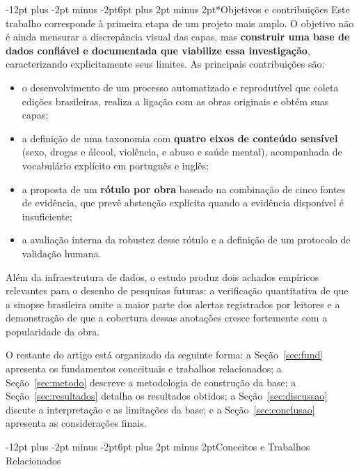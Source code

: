 \documentclass[12pt]{article}
\makeatletter
\renewcommand{\section}{\@startsection{section}{1}{\z@}%
  {-12pt plus -2pt minus -2pt}{6pt plus 2pt minus 2pt}{\normalfont\large\bfseries}}
\renewcommand{\subsection}{\@startsection{subsection}{2}{\z@}%
  {-12pt plus -2pt minus -2pt}{6pt plus 2pt minus 2pt}{\normalfont\normalsize\bfseries}}
\makeatother
\begin{document}
\subsection*{Objetivos e contribuições}
Este trabalho corresponde à primeira etapa de um projeto mais amplo. O objetivo não é ainda mensurar a discrepância visual das capas, mas \textbf{construir uma base de dados confiável e documentada que viabilize essa investigação}, caracterizando explicitamente seus limites. As principais contribuições são:
\begin{itemize}
  \item o desenvolvimento de um processo automatizado e reprodutível que coleta edições brasileiras, realiza a ligação com as obras originais e obtém suas capas;
  \item a definição de uma taxonomia com \textbf{quatro eixos de conteúdo sensível} (sexo, drogas e álcool, violência, e abuso e saúde mental), acompanhada de vocabulário explícito em português e inglês;
  \item a proposta de um \textbf{rótulo por obra} baseado na combinação de cinco fontes de evidência, que prevê abstenção explícita quando a evidência disponível é insuficiente;
  \item a avaliação interna da robustez desse rótulo e a definição de um protocolo de validação humana.
\end{itemize}

Além da infraestrutura de dados, o estudo produz dois achados empíricos relevantes para o desenho de pesquisas futuras: a verificação quantitativa de que a sinopse brasileira omite a maior parte dos alertas registrados por leitores e a demonstração de que a cobertura dessas anotações cresce fortemente com a popularidade da obra.

O restante do artigo está organizado da seguinte forma: a Seção~\ref{sec:fund} apresenta os fundamentos conceituais e trabalhos relacionados; a Seção~\ref{sec:metodo} descreve a metodologia de construção da base; a Seção~\ref{sec:resultados} detalha os resultados obtidos; a Seção~\ref{sec:discussao} discute a interpretação e as limitações da base; e a Seção~\ref{sec:conclusao} apresenta as considerações finais.

\section{Conceitos e Trabalhos Relacionados}
\label{sec:fund}
\end{document}
